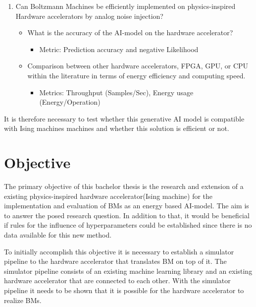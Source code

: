 \begin{enumerate}
    \item Can Boltzmann Machines be efficiently implemented on physics-inspired Hardware accelerators by analog noise injection?
        \begin{itemize}
            \item What is the accuracy of the AI-model on the hardware accelerator?
                \begin{itemize}
                    \item Metric: Prediction accuracy and negative Likelihood
                \end{itemize}
            \item Comparison between other hardware accelerators, FPGA, GPU, or CPU within the literature in terms of energy efficiency and computing speed.
                \begin{itemize}
                    \item Metrics: Throughput (Samples/Sec), Energy usage (Energy/Operation)
                \end{itemize}
        \end{itemize}  
\end{enumerate}

It is therefore necessary to test whether this generative AI model is compatible with Ising machines
machines and whether this solution is efficient or not.


\section{Objective}

The primary objective of this bachelor thesis is the research and extension of a existing physics-inspired
hardware accelerator(Ising machine) for the implementation and evaluation of \ac{BM}s as an energy based 
AI-model. The aim is to answer the posed research question. 
In addition to that, it would be beneficial if rules for the influence of hyperparameters could be established
since there is no data available for this new method.

To initially accomplish this objective it is necessary to establish a simulator pipeline to the
hardware accelerator that translates \ac{BM} on top of it.
The simulator pipeline consists of an existing machine learning library and an existing hardware accelerator
that are connected to each other.
With the simulator pipeline it needs to be shown that it is possible for the hardware accelerator
to realize \ac{BM}s.

